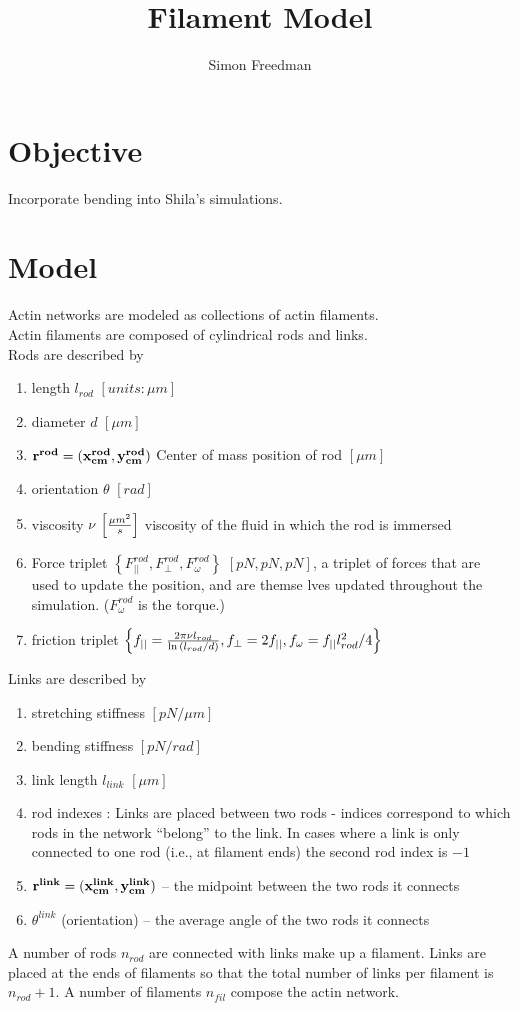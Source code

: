 \documentclass[11pt]{article}
\begin{document}
\title{Filament Model}
\author{Simon Freedman}
\date{}
\maketitle
\section{Objective} 
Incorporate bending into Shila's simulations.
\section{Model} 
Actin networks are modeled as collections of actin filaments.
\\Actin filaments are composed of cylindrical rods and links.  
\\Rods are described by 
\begin{enumerate}
  \item length $l_{rod}$ $\left[units: \mu m\right]$
  \item diameter $d$ $\left[\mu m\right]$
  \item $\bf{r^{rod}}=(x^{rod}_{cm},y^{rod}_{cm})$ Center of mass position of rod $\left[\mu m\right]$
  \item orientation $\theta$ $\left[rad\right]$
  \item viscosity $\nu$ $\left[{\mu m}^2\over s\right]$ viscosity of the fluid in which the rod is immersed
  \item Force triplet $\left\{F^{rod}_{||}, F^{rod}_{\perp}, F^{rod}_{\omega}\right\}$ $[{pN, pN, pN}]$, a triplet of forces that are used
    to update the position, and are themse lves updated throughout the simulation. ($F^{rod}_{\omega}$ is the torque.) 
  \item friction triplet $\left\{f_{||} = {2\pi \nu l_{rod} \over \ln{(l_{rod}/d)}  }, f_{\perp} = 2f_{||},
    f_{\omega} = f_{||}l_{rod}^2/4\right\}$ 
\end{enumerate}

Links are described by
\begin{enumerate}
  \item stretching stiffness $\left[pN/\mu m\right]$
  \item bending stiffness $\left[pN/rad\right]$
  \item link length $l_{link}$ $\left[\mu m\right]$
  \item rod indexes : Links are placed between two rods - indices correspond to which rods in the network ``belong'' to
    the link. In cases where a link is only connected to one rod (i.e., at filament ends) the second rod index is $-1$
  \item  $\bf{r^{link}}=(x^{link}_{cm},y^{link}_{cm})$ -- the midpoint between the two rods it
    connects
  \item $\theta^{link}$ (orientation) -- the average angle of the two rods it connects
\end{enumerate}
A number of rods $n_{rod}$ are connected with links make up a filament. Links are placed at the ends of filaments so
that the total number of links per filament is $n_{rod} + 1$. A number of filaments $n_ {fil}$ compose the actin network.
\end{document}

